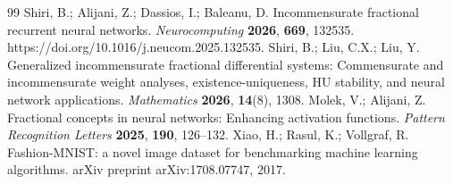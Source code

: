 \documentclass[pdflatex,sn-mathphys-num]{sn-jnl}%
\theoremstyle{thmstyleone}%
\theoremstyle{thmstyletwo}%
\theoremstyle{thmstylethree}%
\begin{document}
\begin{thebibliography}{99}
 Shiri, B.; Alijani, Z.; Dassios, I.; Baleanu, D. Incommensurate fractional recurrent neural networks. \textit{Neurocomputing} \textbf{2026}, \textbf{669}, 132535. https://doi.org/10.1016/j.neucom.2025.132535.
 Shiri, B.; Liu, C.X.; Liu, Y. Generalized incommensurate 
fractional differential systems: Commensurate and incommensurate weight analyses, 
existence-uniqueness, HU stability, and neural network applications. 
\textit{Mathematics} \textbf{2026}, \textbf{14}(8), 1308.
 Molek, V.; Alijani, Z. Fractional concepts in neural 
networks: Enhancing activation functions. \textit{Pattern Recognition Letters} \textbf{2025}, \textbf{190}, 126--132.
 Xiao, H.; Rasul, K.; Vollgraf, R. Fashion-MNIST: a novel image
dataset for benchmarking machine learning algorithms. arXiv preprint arXiv:1708.07747, 2017.






\end{thebibliography}
\end{document}
